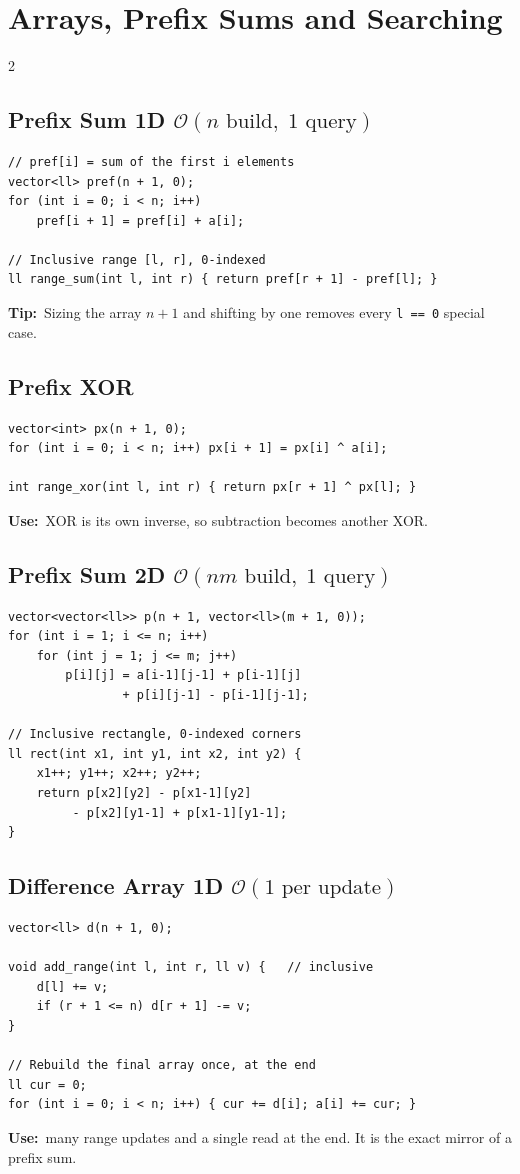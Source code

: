 \documentclass[10pt]{article}
\newcommand{\code}[1]{\texttt{\small #1}}
\newcommand{\sub}[2]{\subsection[#1]{#1\hspace{0.6em}%
  \textnormal{\color{accent2}\small$\mathcal{O}(#2)$}}}
\newcommand{\uses}[1]{{\color{accent2}\footnotesize\textbf{Use:}}~{\footnotesize #1}\par}
\newcommand{\tip}[1]{{\color{tipc}\footnotesize\textbf{Tip:}}~{\footnotesize #1}\par}
\begin{document}
\section{Arrays, Prefix Sums and Searching}
\begin{multicols}{2}

\sub{Prefix Sum 1D}{n \text{ build},\; 1 \text{ query}}
\begin{lstlisting}
// pref[i] = sum of the first i elements
vector<ll> pref(n + 1, 0);
for (int i = 0; i < n; i++)
    pref[i + 1] = pref[i] + a[i];

// Inclusive range [l, r], 0-indexed
ll range_sum(int l, int r) { return pref[r + 1] - pref[l]; }
\end{lstlisting}
\tip{Sizing the array $n+1$ and shifting by one removes every
\code{l == 0} special case.}

\subsection{Prefix XOR}
\begin{lstlisting}
vector<int> px(n + 1, 0);
for (int i = 0; i < n; i++) px[i + 1] = px[i] ^ a[i];

int range_xor(int l, int r) { return px[r + 1] ^ px[l]; }
\end{lstlisting}
\uses{XOR is its own inverse, so subtraction becomes another XOR.}

\sub{Prefix Sum 2D}{nm \text{ build},\; 1 \text{ query}}
\begin{lstlisting}
vector<vector<ll>> p(n + 1, vector<ll>(m + 1, 0));
for (int i = 1; i <= n; i++)
    for (int j = 1; j <= m; j++)
        p[i][j] = a[i-1][j-1] + p[i-1][j]
                + p[i][j-1] - p[i-1][j-1];

// Inclusive rectangle, 0-indexed corners
ll rect(int x1, int y1, int x2, int y2) {
    x1++; y1++; x2++; y2++;
    return p[x2][y2] - p[x1-1][y2]
         - p[x2][y1-1] + p[x1-1][y1-1];
}
\end{lstlisting}

\sub{Difference Array 1D}{1 \text{ per update}}
\begin{lstlisting}
vector<ll> d(n + 1, 0);

void add_range(int l, int r, ll v) {   // inclusive
    d[l] += v;
    if (r + 1 <= n) d[r + 1] -= v;
}

// Rebuild the final array once, at the end
ll cur = 0;
for (int i = 0; i < n; i++) { cur += d[i]; a[i] += cur; }
\end{lstlisting}
\uses{many range updates and a single read at the end. It is the exact
mirror of a prefix sum.}


\end{multicols}
\end{document}
